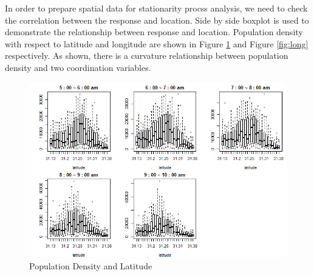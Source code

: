 \documentclass[hidelinks,12pt]{article}
\begin{document}
	In order to prepare spatial data for stationarity procss analysis, we need to check the correlation between the response and location. Side by side boxplot is used to demonstrate the relationship between response and location. Population density with respect to latitude and longitude are shown in Figure \ref{fig:lat} and Figure \ref{fig:long} respectively. As shown, there is a curvature relationship between population density and two coordination variables.	
	\begin{figure}[!ht]
		\includegraphics[width=\textwidth]{lat.png}
		\caption{Population Density and Latitude\label{fig:lat}}
	\end{figure}
	\FloatBarrier
	
\end{document}
